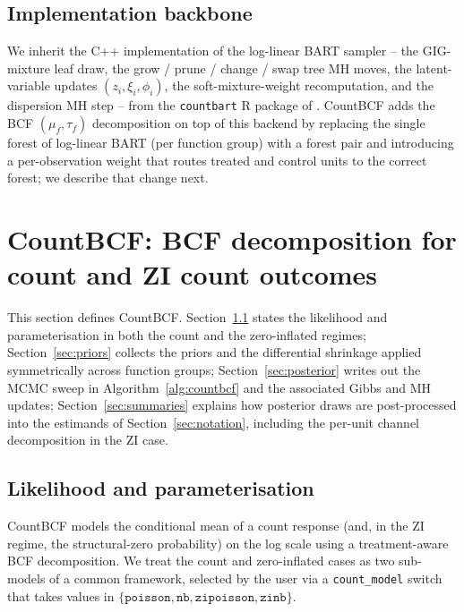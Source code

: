 \documentclass[11pt]{article}
\theoremstyle{plain}
\theoremstyle{definition}
\theoremstyle{remark}
\newcommand{\muF}{\mu_f}
\newcommand{\tauF}{\tau_f}
\newcommand{\zilat}{z_{i}}
\newcommand{\xilat}{\xi_{i}}
\newcommand{\philat}{\phi_{i}}
\begin{document}
\subsection{Implementation backbone}\label{sec:backend-note}

We inherit the C++ implementation of the log-linear BART sampler --
the GIG-mixture leaf draw, the grow / prune / change / swap tree MH
moves, the latent-variable updates $(\zilat, \xilat, \philat)$, the
soft-mixture-weight recomputation, and the dispersion MH step -- from
the \texttt{countbart} R package of \citet{wikle2023causal}. CountBCF
adds the BCF $(\muF, \tauF)$ decomposition on top of this backend by
replacing the single forest of log-linear BART (per function group)
with a forest pair and introducing a per-observation weight that
routes treated and control units to the correct forest; we describe
that change next.

\section{CountBCF: BCF decomposition for count and ZI count
outcomes}\label{sec:countbcf}

This section defines CountBCF. Section~\ref{sec:likelihood} states
the likelihood and parameterisation in both the count and the
zero-inflated regimes; Section~\ref{sec:priors} collects the priors
and the differential shrinkage applied symmetrically across function
groups; Section~\ref{sec:posterior} writes out the MCMC sweep in
Algorithm~\ref{alg:countbcf} and the associated Gibbs and MH updates;
Section~\ref{sec:summaries} explains how posterior draws are
post-processed into the estimands of Section~\ref{sec:notation},
including the per-unit channel decomposition in the ZI case.

\subsection{Likelihood and parameterisation}\label{sec:likelihood}

CountBCF models the conditional mean of a count response (and, in the
ZI regime, the structural-zero probability) on the log scale using a
treatment-aware BCF decomposition. We treat the count and
zero-inflated cases as two sub-models of a common framework, selected
by the user via a \texttt{count\_model} switch that takes values in
$\{\texttt{poisson}, \texttt{nb}, \texttt{zipoisson}, \texttt{zinb}\}$.
\end{document}
